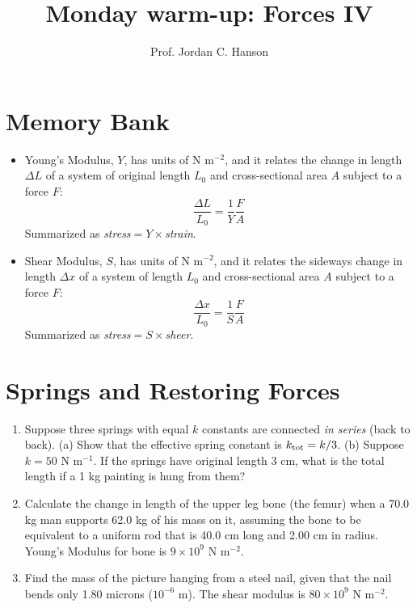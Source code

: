 \documentclass{article}
\begin{document}
\twocolumn

\title{Monday warm-up: Forces IV}
\author{Prof. Jordan C. Hanson}

\maketitle

\section{Memory Bank}

\begin{itemize}
\item Young's Modulus, $Y$, has units of N m$^{-2}$, and it relates the change in length $\Delta L$ of a system of original length $L_0$ and cross-sectional area $A$ subject to a force $F$:
\begin{equation}
\frac{\Delta L}{L_0} = \frac{1}{Y} \frac{F}{A}
\end{equation}
Summarized as \textit{stress}$= Y\times$\textit{strain}.
\item Shear Modulus, $S$, has units of N m$^{-2}$, and it relates the sideways change in length $\Delta x$ of a system of length $L_0$ and cross-sectional area $A$ subject to a force $F$:
\begin{equation}
\frac{\Delta x}{L_0} = \frac{1}{S} \frac{F}{A}
\end{equation}
Summarized as \textit{stress}$= S\times$\textit{sheer}.
\end{itemize}

\section{Springs and Restoring Forces}

\begin{enumerate}
\item Suppose three springs with equal $k$ constants are connected \textit{in series} (back to back).  (a) Show that the effective spring constant is $k_{\rm tot} = k/3$.  (b) Suppose $k=50$ N m$^{-1}$.  If the springs have original length $3$ cm, what is the total length if a 1 kg painting is hung from them? \\ \vspace{3.5cm}
\item Calculate the change in length of the upper leg bone (the femur) when a 70.0 kg man supports 62.0 kg of his mass on it, assuming the bone to be equivalent to a uniform rod that is 40.0 cm long and 2.00 cm in radius. Young's Modulus for bone is $9 \times 10^9$ N m$^{-2}$. \\ \vspace{3cm}
\item Find the mass of the picture hanging from a steel nail, given that the nail bends only 1.80 microns ($10^{-6}$ m).  The shear modulus is $80 \times 10^9$ N m$^{-2}$. \\ \vspace{3cm}
\end{enumerate}
\end{document}

